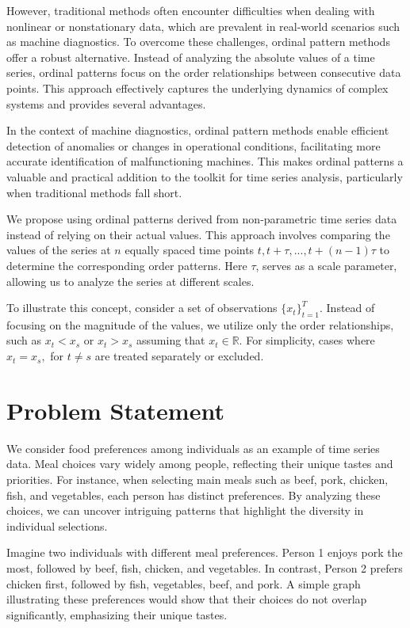 However, traditional methods often encounter difficulties when dealing with nonlinear or nonstationary data, which are prevalent in real-world scenarios such as machine diagnostics. To overcome these challenges, ordinal pattern methods offer a robust alternative. Instead of analyzing the absolute values of a time series, ordinal patterns focus on the order relationships between consecutive data points. This approach effectively captures the underlying dynamics of complex systems and provides several advantages. 

In the context of machine diagnostics, ordinal pattern methods enable efficient detection of anomalies or changes in operational conditions, facilitating more accurate identification of malfunctioning machines. This makes ordinal patterns a valuable and practical addition to the toolkit for time series analysis, particularly when traditional methods fall short.

We propose using ordinal patterns derived from non-parametric time series data instead of relying on their actual values. This approach involves comparing the values of the series at $n$ equally spaced time points $t, t+\tau, ..., t+(n-1)\tau$ to determine the corresponding order patterns. Here $\tau$, serves as a scale parameter, allowing us to analyze the series at different scales.
 
To illustrate this concept, consider a set of observations $\{x_t\}^T_{t=1}$. Instead of focusing on the magnitude of the values, we utilize only the order relationships, such as $x_t< x_s$ or $x_t >x_s$ assuming that $x_t \in \mathbb{R}$. For simplicity, cases where  $x_t =x_s,$ for $t\neq s$ are treated separately or excluded.   

\section*{Problem Statement}
We consider food preferences among individuals as an example of time series data. Meal choices vary widely among people, reflecting their unique tastes and priorities. For instance, when selecting main meals such as beef, pork, chicken, fish, and vegetables, each person has distinct preferences. By analyzing these choices, we can uncover intriguing patterns that highlight the diversity in individual selections.

Imagine two individuals with different meal preferences. Person 1 enjoys pork the most, followed by beef, fish, chicken, and vegetables. In contrast, Person 2 prefers chicken first, followed by fish, vegetables, beef, and pork. A simple graph illustrating these preferences would show that their choices do not overlap significantly, emphasizing their unique tastes.

